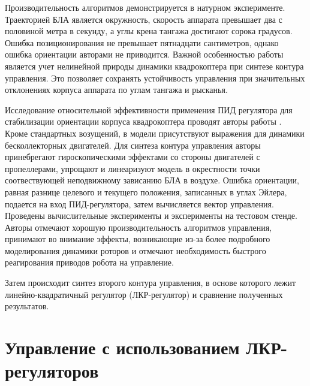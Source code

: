 Производительность алгоритмов демонстрируется в натурном эксперименте. Траекторией БЛА является окружность, скорость аппарата превышает два с половиной метра в секунду, а углы крена тангажа достигают сорока градусов. Ошибка позиционирования не превышает пятнадцати сантиметров, однако ошибка ориентации авторами не приводится. Важной особенностью работы является учет нелинейной природы динамики квадрокоптера при синтезе контура управления. Это позволяет сохранять устойчивость управления при значительных отклонениях корпуса аппарата по углам тангажа и рысканья.

Исследование относительной эффективности применения ПИД регулятора для стабилизации ориентации корпуса квадрокоптера проводят авторы работы \cite{Bouabdallah01}. Кроме стандартных возущений, в модели присутствуют выражения для динамики бесколлекторных двигателей. Для синтеза контура управления авторы принебрегают гироскопическими эффектами со стороны двигателей с пропеллерами, упрощают и линеаризуют модель в окрестности точки соотвествующей неподвижному зависанию БЛА в воздухе. Ошибка ориентации, равная разнице целевого и текущего положения, записанных в углах Эйлера, подается на вход ПИД-регулятора, затем вычисляется вектор управления. Проведены вычислительные эксперименты и эксперименты на тестовом стенде. Авторы отмечают хорошую производительность алгоритмов управления, принимают во внимание эффекты, возникающие из-за более подробного моделирования динамики роторов и отмечают необходимость быстрого реагирования приводов робота на управление.

Затем происходит синтез второго контура управления, в основе которого лежит линейно-квадратичный регулятор (ЛКР-регулятор) и сравнение полученных результатов.
	

\section{Управление с использованием ЛКР-регуляторов}

